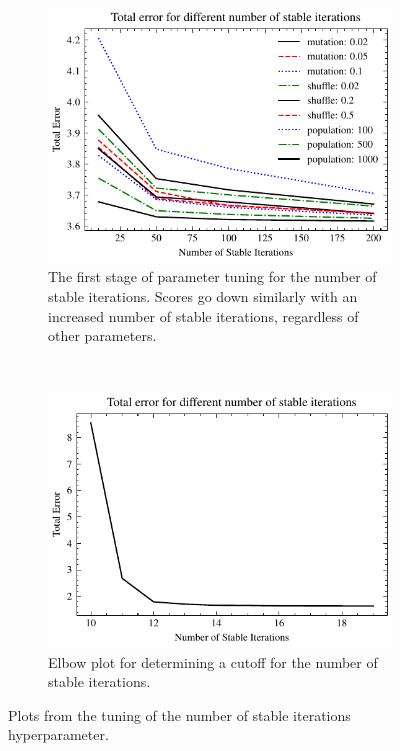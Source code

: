 \begin{figure}[ht]
    \centering
    \begin{subfigure}[t]{0.45\textwidth}
        \centering
        \includegraphics[width=\textwidth]{chapters/figures/iterations_plot_stage1.pdf}
        \captionsetup{width=.9\linewidth}
        \caption{The first stage of parameter tuning for the number of stable iterations. Scores go down similarly with an increased number of stable iterations, regardless of other parameters.}
    \end{subfigure}%
    ~ 
    \begin{subfigure}[t]{0.45\textwidth}
        \centering
        \includegraphics[width=\textwidth]{chapters/figures/iterations_plot.pdf}
        \captionsetup{width=.9\linewidth}
        \caption{Elbow plot for determining a cutoff for the number of stable iterations.}
    \end{subfigure}
    \caption{Plots from the tuning of the number of stable iterations hyperparameter.}
    \label{fig:param_search_cv_n_itter}
\end{figure}


